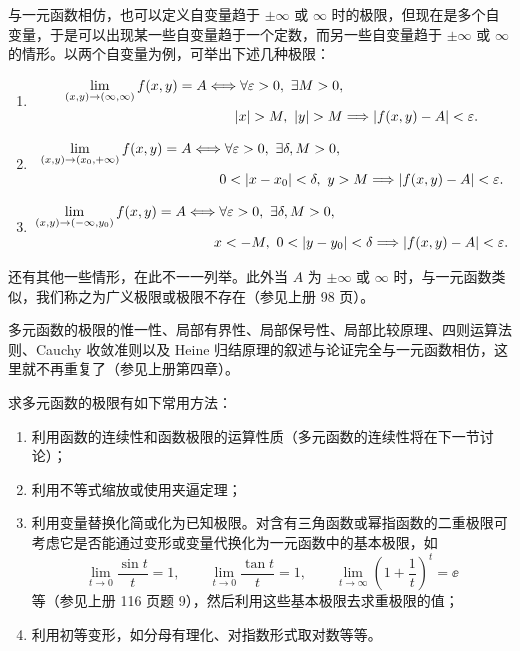 与一元函数相仿，也可以定义自变量趋于 $\pm\infty$ 或 $\infty$ 时的极限，但现在是多个自变量，于是可以出现某一些自变量趋于一个定数，而另一些自变量趋于 $\pm\infty$ 或 $\infty$ 的情形。以两个自变量为例，可举出下述几种极限：
\begin{enumerate}[label=(\arabic*)]
  \item
  \[
  \begin{aligned}
    \lim_{(x,y)\to(\infty,\infty)}f(x,y)=A
    &\Longleftrightarrow \forall\varepsilon>0,\ \exists M>0,\\
    &\qquad \lvert x\rvert>M,\ \lvert y\rvert>M
    \Longrightarrow \lvert f(x,y)-A\rvert<\varepsilon.
  \end{aligned}
  \]
  \item
  \[
  \begin{aligned}
    \lim_{(x,y)\to(x_0,+\infty)}f(x,y)=A
    &\Longleftrightarrow \forall\varepsilon>0,\ \exists\delta,M>0,\\
    &\qquad 0<\abs{x-x_0}<\delta,\ y>M
    \Longrightarrow \abs{f(x,y)-A}<\varepsilon.
  \end{aligned}
  \]
  \item
  \[
  \begin{aligned}
    \lim_{(x,y)\to(-\infty,y_0)}f(x,y)=A
    &\Longleftrightarrow \forall\varepsilon>0,\ \exists\delta,M>0,\\
    &\qquad x<-M,\ 0<\abs{y-y_0}<\delta
    \Longrightarrow \abs{f(x,y)-A}<\varepsilon.
  \end{aligned}
  \]
\end{enumerate}
还有其他一些情形，在此不一一列举。此外当 $A$ 为 $\pm\infty$ 或 $\infty$ 时，与一元函数类似，我们称之为广义极限或极限不存在（参见上册 98 页）。

多元函数的极限的惟一性、局部有界性、局部保号性、局部比较原理、四则运算法则、Cauchy 收敛准则以及 Heine 归结原理的叙述与论证完全与一元函数相仿，这里就不再重复了（参见上册第四章）。

求多元函数的极限有如下常用方法：
\begin{enumerate}[label=\arabic*.]
  \item 利用函数的连续性和函数极限的运算性质（多元函数的连续性将在下一节讨论）；
  \item 利用不等式缩放或使用夹逼定理；
  \item 利用变量替换化简或化为已知极限。对含有三角函数或幂指函数的二重极限可考虑它是否能通过变形或变量代换化为一元函数中的基本极限，如
  \[
    \lim_{t\to0}\frac{\sin t}{t}=1,\qquad
    \lim_{t\to0}\frac{\tan t}{t}=1,\qquad
    \lim_{t\to\infty}\left(1+\frac1t\right)^t=\ee
  \]
  等（参见上册 116 页题 9），然后利用这些基本极限去求重极限的值；
  \item 利用初等变形，如分母有理化、对指数形式取对数等等。
\end{enumerate}

